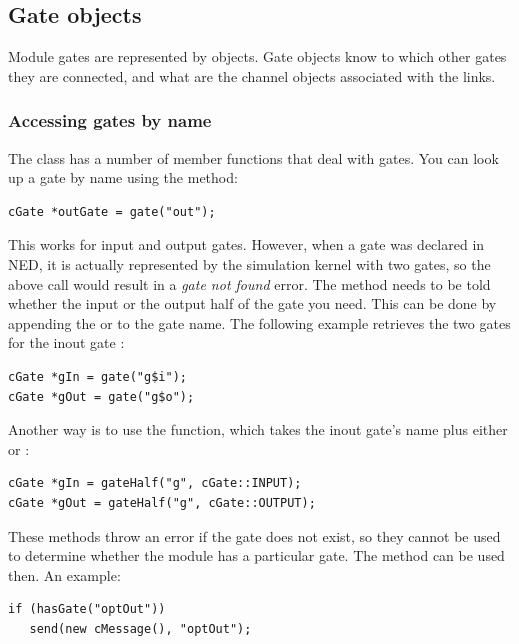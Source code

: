 \subsection{Gate objects}


Module gates are represented by  objects.
Gate objects know to which other gates they are connected, and
what are the channel objects associated with the links.

\subsubsection{Accessing gates by name}

The  class has a number of member functions that
deal with gates. You can look up a gate by name using the 
method:

\begin{verbatim}
cGate *outGate = gate("out");
\end{verbatim}

This works for input and output gates. However, when a gate was declared
 in NED, it is actually represented by the simulation kernel
with two gates, so the above call would result in a \textit{gate not found}
error. The  method needs to be told whether the input or
the output half of the gate you need. This can be done by appending
the  or  to the gate name. The following example
retrieves the two gates for the inout gate :

\begin{verbatim}
cGate *gIn = gate("g$i");
cGate *gOut = gate("g$o");
\end{verbatim}

Another way is to use the  function, which takes
the inout gate's name plus either  or :

\begin{verbatim}
cGate *gIn = gateHalf("g", cGate::INPUT);
cGate *gOut = gateHalf("g", cGate::OUTPUT);
\end{verbatim}

These methods throw an error if the gate does not exist, so they cannot
be used to determine whether the module has a particular gate.
The  method can be used then. An example:

\begin{verbatim}
if (hasGate("optOut"))
   send(new cMessage(), "optOut");
\end{verbatim}

